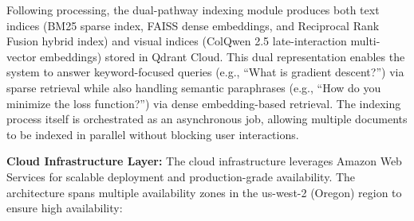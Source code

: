 Following processing, the dual-pathway indexing module produces both text indices (BM25 sparse index, FAISS dense embeddings, and Reciprocal Rank Fusion hybrid index) and visual indices (ColQwen 2.5 late-interaction multi-vector embeddings) stored in Qdrant Cloud. This dual representation enables the system to answer keyword-focused queries (e.g., ``What is gradient descent?'') via sparse retrieval while also handling semantic paraphrases (e.g., ``How do you minimize the loss function?'') via dense embedding-based retrieval. The indexing process itself is orchestrated as an asynchronous job, allowing multiple documents to be indexed in parallel without blocking user interactions.

\textbf{Cloud Infrastructure Layer:} The cloud infrastructure leverages Amazon Web Services for scalable deployment and production-grade availability. The architecture spans multiple availability zones in the us-west-2 (Oregon) region to ensure high availability:

